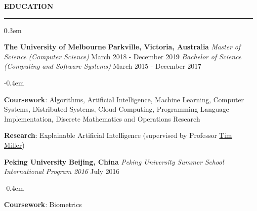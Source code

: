 \documentclass{cv}
\begin{document}
\sectionskip


 \textbf{\uppercase{Education}}
\sectionlineskip
\hrule
\begin{list}{}{\setlength{\leftmargin}{0em}}
\itemsep 0.3em
\item
    \textbf{The University of Melbourne} \hfill \textbf{Parkville, Victoria, Australia}%
    \vspace{0.1em} \newline
    {\textit{Master of Science (Computer Science)}} \hfill {March 2018 - December 2019}%
    \newline
    {\textit{Bachelor of Science (Computing and Software Systems)}} \hfill {March 2015 - December 2017}%
    \begin{list}{\raisebox{0.2em}{\tiny$\bullet$} \hspace{0em}}{\setlength{\leftmargin}{2.0em}}
        \itemsep -0.4em \vspace{-0.4em}
        \item \textbf{Coursework}: Algorithms, Artificial Intelligence, Machine Learning, Computer Systems, Distributed Systems, Cloud Computing, Programming Language Implementation, Discrete Mathematics and Operations Research
        \item \textbf{Research}: Explainable Artificial Intelligence (supervised by Professor \href{https://eecs.uq.edu.au/profile/9477/tim-miller}{Tim Miller})
    \end{list}
\item
    \textbf{Peking University} \hfill \textbf{Beijing, China}%
    \vspace{0.1em} \newline 
    {\textit{Peking University Summer School International Program 2016}} \hfill {July 2016}%
    \begin{list}{\raisebox{0.2em}{\tiny$\bullet$} \hspace{0em}}{\setlength{\leftmargin}{2.0em}}
        \itemsep -0.4em \vspace{-0.4em}
        \item \textbf{Coursework}: Biometrics
    \end{list}
\end{list}

\end{document}
